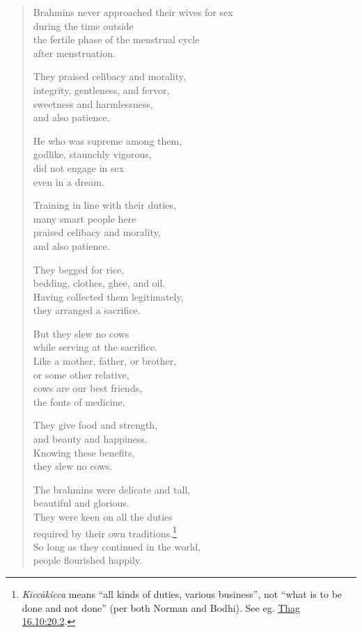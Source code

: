 \documentclass[12pt,openany]{book}%
\begin{document}
\begin{verse}
Brahmins never approached their wives for sex \\
during the time outside \\
the fertile phase of the menstrual cycle \\
after menstruation. 

They praised celibacy and morality, \\
integrity, gentleness, and fervor, \\
sweetness and harmlessness, \\
and also patience. 

He who was supreme among them, \\
godlike, staunchly vigorous, \\
did not engage in sex \\
even in a dream. 

Training in line with their duties, \\
many smart people here \\
praised celibacy and morality, \\
and also patience. 

They begged for rice, \\
bedding, clothes, ghee, and oil. \\
Having collected them legitimately, \\
they arranged a sacrifice. 

But they slew no cows \\
while serving at the sacrifice. \\
Like a mother, father, or brother, \\
or some other relative, \\
cows are our best friends, \\
the fonts of medicine. 

They give food and strength, \\
and beauty and happiness. \\
Knowing these benefits, \\
they slew no cows. 

The brahmins were delicate and tall, \\
beautiful and glorious. \\
They were keen on all the duties \\
required by their own traditions.\footnote{\textit{\textsanskrit{Kiccākicca}} means “all kinds of duties, various business”, not “what is to be done and not done” (per both Norman and Bodhi). See eg. \href{https://suttacentral.net/thag16.10/en/sujato\#20.2}{Thag 16.10:20.2}. } \\
So long as they continued in the world, \\
people flourished happily. 


\end{verse}
\end{document}
